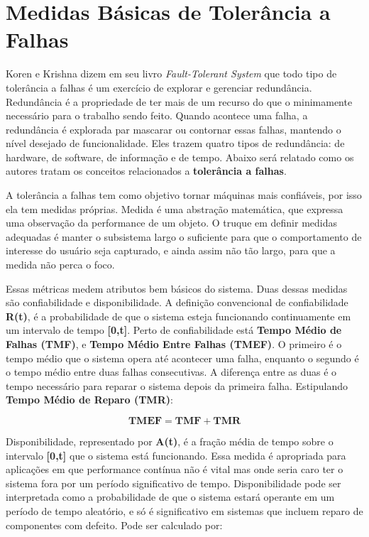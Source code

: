 \chapter{Medidas Básicas de Tolerância a Falhas}
\label{falhas}

Koren e Krishna \cite{koren2007} dizem em seu livro \emph{Fault-Tolerant System} que todo tipo de tolerância a falhas é um exercício de explorar e gerenciar redundância. Redundância é a propriedade de ter mais de um recurso do que o minimamente necessário para o trabalho sendo feito. Quando acontece uma falha, a redundância é explorada par mascarar ou contornar essas falhas, mantendo o nível desejado de funcionalidade. Eles trazem quatro tipos de redundância: de hardware, de software, de informação e de tempo. Abaixo será relatado como os autores tratam os conceitos relacionados a \textbf{tolerância a falhas}. 

A tolerância a falhas tem como objetivo tornar máquinas mais confiáveis, por isso ela tem medidas próprias. Medida é uma abstração matemática, que expressa uma observação da performance de um objeto. O truque em definir medidas adequadas é manter o subsistema largo o suficiente para que o comportamento de interesse do usuário seja capturado, e ainda assim não tão largo, para que a medida não perca o foco. 

Essas métricas medem atributos bem básicos do sistema. Duas dessas medidas são confiabilidade e disponibilidade. A definição convencional de confiabilidade \textbf{R(t)}, é a probabilidade de que o sistema esteja funcionando continuamente em um intervalo de tempo \textbf{[0,t]}.
Perto de confiabilidade está \textbf{Tempo Médio de Falhas (TMF)},  e \textbf{Tempo Médio Entre Falhas (TMEF)}. O primeiro é o tempo médio que o sistema opera até acontecer uma falha, enquanto o segundo é o tempo médio entre duas falhas consecutivas. A diferença entre as duas  é o tempo necessário para reparar o sistema depois da primeira falha. Estipulando \textbf{Tempo Médio de Reparo (TMR)}:

\begin{equation}
\label{eqn01}
	\mathbf{TMEF} = \mathbf{TMF} + \mathbf{TMR} 
\end{equation}

Disponibilidade, representado por \textbf{A(t)}, é a fração média de tempo sobre o intervalo \textbf{[0,t]} que o sistema está funcionando. Essa medida é apropriada para aplicações em que performance contínua não é vital mas onde seria caro ter o sistema fora por um período significativo de tempo. 
Disponibilidade pode ser interpretada como a probabilidade de que o sistema estará operante em um período de tempo aleatório, e só é significativo em sistemas que incluem reparo de componentes com defeito. Pode ser calculado por:

